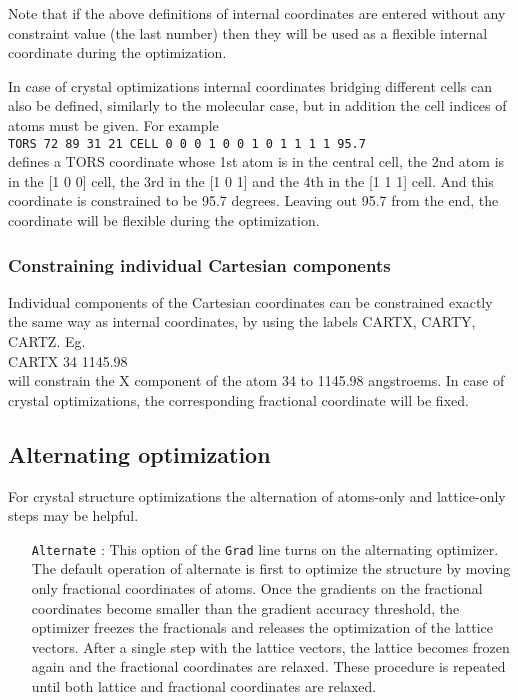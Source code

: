 \documentclass[prl,aps,preprint,superbib,12pt]{revtex4}
\begin{document}
Note that if the above definitions of internal coordinates are entered
without any constraint value (the last number) then they will be used as 
a flexible internal coordinate during the optimization.

In case of crystal optimizations internal coordinates bridging different
cells can also be defined, similarly to the molecular case, but
in addition the cell indices of atoms must be given.
For example
\\
{\tt TORS 72 89 31 21 CELL 0 0 0  1 0 0  1 0 1  1 1 1  95.7}
\\
defines a TORS coordinate whose 1st atom is in the central cell,
the 2nd atom is in the [1 0 0] cell, the 3rd in the [1 0 1] and
the 4th in the [1 1 1] cell. And this coordinate is constrained to
be 95.7 degrees. Leaving out 95.7 from the end, the coordinate will be
flexible during the optimization.

\subsubsection{Constraining individual Cartesian components}
Individual components of the Cartesian coordinates can be constrained 
exactly the same way as internal coordinates, by using the labels
CARTX, CARTY, CARTZ. Eg.
\\
CARTX 34 1145.98
\\
will constrain the X component of the atom 34 to 1145.98 angstroems.
In case of crystal optimizations, the corresponding fractional
coordinate will be fixed.

\subsection{Alternating optimization}
For crystal structure optimizations the alternation of atoms-only and
lattice-only steps may be helpful.
\begin{itemize}
\item[{\tt Alternate}] :
This option of the {\tt Grad} line turns on the alternating optimizer. 
The default operation 
of alternate is first to optimize the structure by moving only
fractional coordinates of atoms. Once the gradients on the fractional 
coordinates become smaller than the gradient accuracy threshold,
the optimizer freezes the fractionals and releases the optimization of
the lattice vectors. After a single step with the lattice vectors,
the lattice becomes frozen again and the fractional coordinates are 
relaxed. These procedure is repeated until both lattice and fractional
coordinates are relaxed.
\end{itemize}
\end{document}
